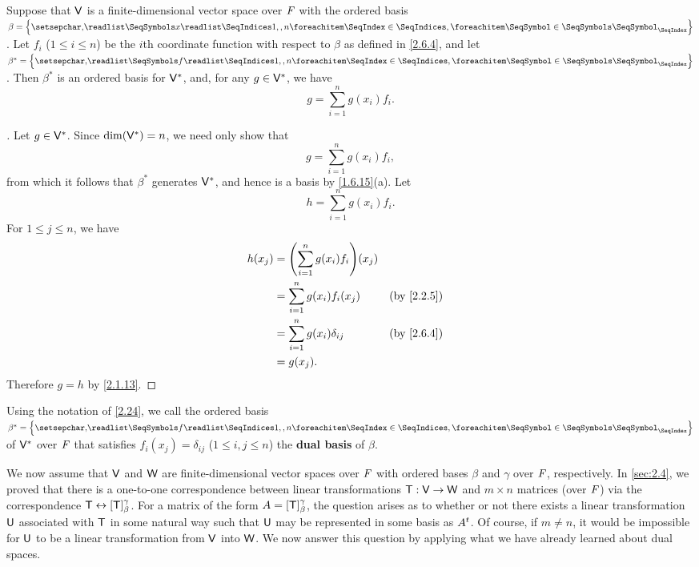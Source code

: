 \begin{thm}\label{2.24}
  Suppose that \(\mathsf{V}\) is a finite-dimensional vector space over \(\mathit{F}\) with the ordered basis \(\beta = \set{\seq{x}{1,,n}}\).
  Let \(f_i\) (\(1 \leq i \leq n\)) be the \(i\)th coordinate function with respect to \(\beta\) as defined in \cref{2.6.4}, and let \(\beta^* = \set{\seq{f}{1,,n}}\).
  Then \(\beta^*\) is an ordered basis for \(\mathsf{V}^*\), and, for any \(g \in \mathsf{V}^*\), we have
  \[
    g = \sum_{i = 1}^n g(x_i) f_i.
  \]
\end{thm}

\begin{proof}[]
  Let \(g \in \mathsf{V}^*\).
  Since \(\dim(\mathsf{V}^*) = n\), we need only show that
  \[
    g = \sum_{i = 1}^n g(x_i) f_i,
  \]
  from which it follows that \(\beta^*\) generates \(\mathsf{V}^*\), and hence is a basis by \cref{1.6.15}(a).
  Let
  \[
    h = \sum_{i = 1}^n g(x_i) f_i.
  \]
  For \(1 \leq j \leq n\), we have
  \begin{align*}
    h(x_j) & = \pa{\sum_{i = 1}^n g(x_i) f_i}(x_j)                               \\
           & = \sum_{i = 1}^n g(x_i) f_i(x_j)      &  & \text{(by \cref{2.2.5})} \\
           & = \sum_{i = 1}^n g(x_i) \delta_{i j}  &  & \text{(by \cref{2.6.4})} \\
           & = g(x_j).
  \end{align*}
  Therefore \(g = h\) by \cref{2.1.13}.
\end{proof}

\begin{defn}\label{2.6.6}
  Using the notation of \cref{2.24}, we call the ordered basis \(\beta^* = \set{\seq{f}{1,,n}}\) of \(\mathsf{V}^*\) over \(\mathit{F}\) that satisfies \(f_i(x_j) = \delta_{i j}\) (\(1 \leq i, j \leq n\)) the \textbf{dual basis} of \(\beta\).
\end{defn}

\begin{note}
  We now assume that \(\mathsf{V}\) and \(\mathsf{W}\) are finite-dimensional vector spaces over \(\mathit{F}\) with ordered bases \(\beta\) and \(\gamma\) over \(\mathit{F}\), respectively.
  In \cref{sec:2.4}, we proved that there is a one-to-one correspondence between linear transformations \(\mathsf{T} : \mathsf{V} \to \mathsf{W}\) and \(m \times n\) matrices (over \(\mathit{F}\)) via the correspondence \(\mathsf{T} \leftrightarrow [\mathsf{T}]_{\beta}^{\gamma}\).
  For a matrix of the form \(A = [\mathsf{T}]_{\beta}^{\gamma}\), the question arises as to whether or not there exists a linear transformation \(\mathsf{U}\) associated with \(\mathsf{T}\) in some natural way such that \(\mathsf{U}\) may be represented in some basis as \({A}^{t}\).
  Of course, if \(m \neq n\), it would be impossible for \(\mathsf{U}\) to be a linear transformation from \(\mathsf{V}\) into \(\mathsf{W}\).
  We now answer this question by applying what we have already learned about dual spaces.
\end{note}

